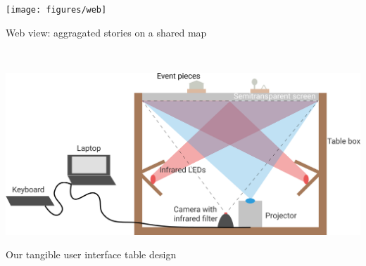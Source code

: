 \documentclass{sigchi-ext}
\begin{document}
\begin{marginfigure}[-57pc]
  \begin{minipage}{\marginparwidth}
    \centering
    \texttt{[image: figures/web]}
    \caption{Web view: aggragated stories on a shared map}~\label{fig:web}
  \end{minipage}
\end{marginfigure}

\begin{marginfigure}[-36pc]
  \begin{minipage}{\marginparwidth}
    \centering
    \includegraphics[width=0.9\marginparwidth]{figures/tui}
    \caption{Our tangible user interface table design}~\label{fig:tui}
  \end{minipage}
\end{marginfigure}
\end{document}

